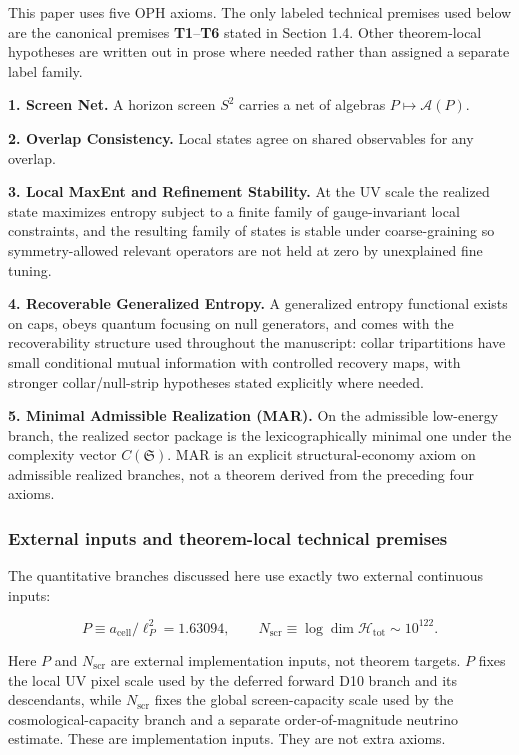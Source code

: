 This paper uses five OPH axioms. The only labeled technical premises used below are the canonical premises \textbf{T1}--\textbf{T6} stated in Section 1.4. Other theorem-local hypotheses are written out in prose where needed rather than assigned a separate label family.

\textbf{1. Screen Net.} A horizon screen \(S^2\) carries a net of algebras \(P \mapsto \mathcal{A}(P)\).

\textbf{2. Overlap Consistency.} Local states agree on shared observables for any overlap.

\textbf{3. Local MaxEnt and Refinement Stability.} At the UV scale the realized state maximizes entropy subject to a finite family of gauge-invariant local constraints, and the resulting family of states is stable under coarse-graining so symmetry-allowed relevant operators are not held at zero by unexplained fine tuning.

\textbf{4. Recoverable Generalized Entropy.} A generalized entropy functional exists on caps, obeys quantum focusing on null generators, and comes with the recoverability structure used throughout the manuscript: collar tripartitions have small conditional mutual information with controlled recovery maps, with stronger collar/null-strip hypotheses stated explicitly where needed.

\textbf{5. Minimal Admissible Realization (MAR).} On the admissible low-energy branch, the realized sector package is the lexicographically minimal one under the complexity vector \(C(\mathfrak S)\). MAR is an explicit structural-economy axiom on admissible realized branches, not a theorem derived from the preceding four axioms.

\subsubsection{External inputs and theorem-local technical premises}\label{14-assumptions-and-external-inputs}

The quantitative branches discussed here use exactly two external continuous inputs:

\[
P \equiv a_{\mathrm{cell}}/\ell_P^2 = 1.63094,
\qquad
N_{\mathrm{scr}} \equiv \log \dim \mathcal H_{\mathrm{tot}} \sim 10^{122}.
\]

Here \(P\) and \(N_{\mathrm{scr}}\) are external implementation inputs, not theorem targets. \(P\) fixes the local UV pixel scale used by the deferred forward D10 branch and its descendants, while \(N_{\mathrm{scr}}\) fixes the global screen-capacity scale used by the cosmological-capacity branch and a separate order-of-magnitude neutrino estimate. These are implementation inputs. They are not extra axioms.

